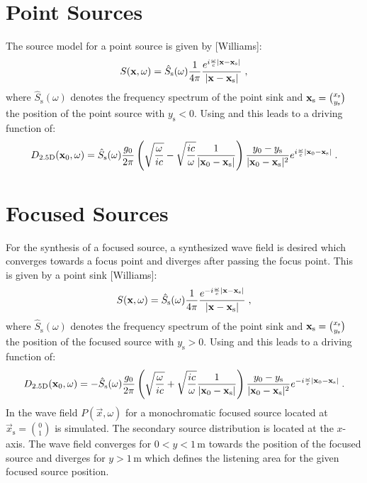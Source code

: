 \documentclass{article}
\begin{document}
\section{Point Sources}
The source model for a point source is given by [Williams]:
\begin{equation} 
    S( \mathbf{x} ,\omega) = 
    \hat{S}_\text{s}(\omega)
    \frac{1}{4\pi} \frac{e^{i \frac{\omega}{c} | \mathbf{x} - \mathbf{x} _\text{s}|}}{| \mathbf{x} - \mathbf{x} _\text{s}|}
    \;, 
\end{equation}
where $\hat{S}_\text{s}(\omega)$ denotes the frequency spectrum of the point
sink and $ \mathbf{x} _\text{s} = \binom{x_\text{s}}{y_\text{s}}$ the position of the
point source with $y_\text{s} < 0$.
Using  and  this leads to a driving function of:
\begin{equation}
    D_{\text{2.5D}}( \mathbf{x} _0,\omega) = \hat{S}_\text{s}(\omega)
    \frac{g_0}{2\pi}
    \left( \sqrt{\frac{\omega}{ic}} - \sqrt{\frac{ic}{\omega}} 
    \frac{1}{| \mathbf{x} _0- \mathbf{x} _\text{s}|} \right)
    \frac{y_0-y_\text{s}}{| \mathbf{x} _0- \mathbf{x} _\text{s}|^{2}} 
    e^{i \frac{\omega}{c} | \mathbf{x} _0- \mathbf{x} _\text{s}|}
    \;.
    \label{eq:Dps}
\end{equation}


\section{Focused Sources}

For the synthesis of a focused source, a synthesized wave field is desired which
converges towards a focus point and diverges after passing the focus point.
This is given by a point sink [Williams]:
\begin{equation} 
    S( \mathbf{x} ,\omega) = 
    \hat{S}_\text{s}(\omega)
    \frac{1}{4\pi} \frac{e^{-i \frac{\omega}{c} | \mathbf{x} - \mathbf{x} _\text{s}|}}{| \mathbf{x} - \mathbf{x} _\text{s}|}
    \;, 
\end{equation}
where $\hat{S}_\text{s}(\omega)$ denotes the frequency spectrum of the point
sink and $ \mathbf{x} _\text{s} = \binom{x_\text{s}}{y_\text{s}}$ the position of the
focused source with $y_\text{s} > 0$.
Using  and  this leads to a driving function of:
\begin{equation}
    D_{\text{2.5D}}( \mathbf{x} _0,\omega) = -\hat{S}_\text{s}(\omega)
    \frac{g_0}{2\pi}
    \left( \sqrt{\frac{\omega}{ic}} + \sqrt{\frac{ic}{\omega}} 
    \frac{1}{| \mathbf{x} _0- \mathbf{x} _\text{s}|} \right)
    \frac{y_0-y_\text{s}}{| \mathbf{x} _0- \mathbf{x} _\text{s}|^{2}} 
    e^{-i \frac{\omega}{c} | \mathbf{x} _0- \mathbf{x} _\text{s}|}
    \;.
    \label{eq:Dfs}
\end{equation}
In  the wave field $P(\vec{x},\omega)$ for
a monochromatic focused
source located at $\vec{x}_\text{s} = \binom{0}{1}$ is simulated. The secondary
source distribution is located at the $x$-axis. The wave field converges for
$0<y<1$\,m towards the position of the focused source and diverges for $y>1$\,m
which defines the listening area for the given focused source position.
\end{document}
